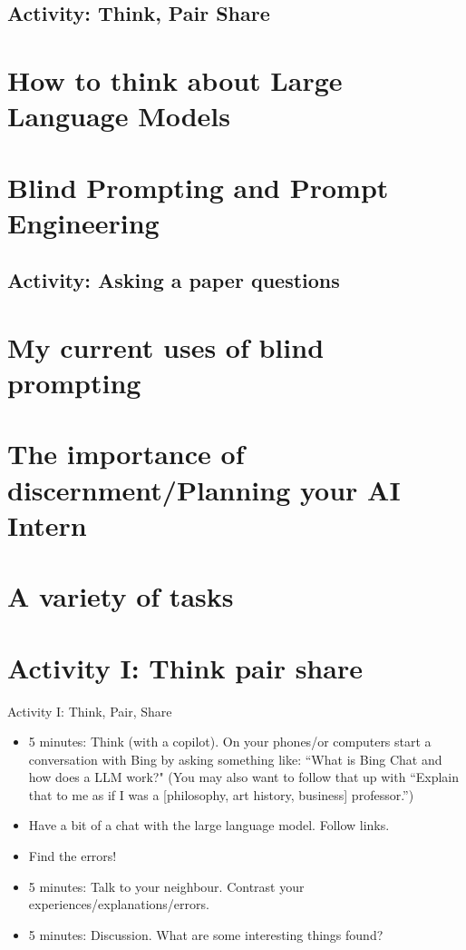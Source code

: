 \documentclass[aspectratio=169]{beamer}
\begin{document}
\subsection{Activity: Think, Pair Share}
\section{How to think about Large Language Models}

\section{Blind Prompting and Prompt Engineering}
\subsection{Activity: Asking a paper questions}
\section{My current uses of blind prompting}
\section{The importance of discernment/Planning your AI Intern}
\section{A variety of tasks}
\section{Activity I: Think pair share}

\begin{frame}{Activity I: Think, Pair, Share}


\begin{itemize}
    \item 5 minutes: Think (with a copilot). On your phones/or computers start a conversation with Bing by asking something like: ``What is Bing Chat and how does a LLM work?" (You may also want to follow that up with ``Explain that to me as if I was a [philosophy, art history, business] professor.'')    
    \item Have a bit of a chat with the large language model. Follow links.
    \item Find the errors!
    \item 5 minutes: Talk to your neighbour. Contrast your experiences/explanations/errors.
    \item 5 minutes: Discussion. What are some interesting things found?
\end{itemize}

\end{frame}
\end{document}
